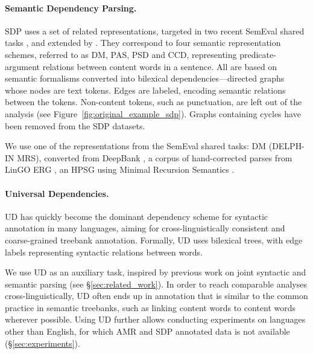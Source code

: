 \documentclass[11pt,a4paper]{article}
\begin{document}
\paragraph{Semantic Dependency Parsing.}\label{sec:sdp}

SDP uses a set of related representations, targeted in two recent SemEval shared tasks 
\cite{oepen2014semeval,oepen2015semeval}, and extended by \citet{oepen2016towards}.
They correspond to four semantic representation schemes, referred to as
DM, PAS, PSD and CCD, representing
predicate-argument relations between content words in a sentence.
All are based on semantic formalisms %
converted into bilexical dependencies---directed graphs whose nodes are text tokens.
Edges are labeled, encoding semantic relations between the tokens.
Non-content tokens, such as punctuation,
are left out of the analysis (see Figure~\ref{fig:original_example_sdp}).
Graphs containing cycles have been removed from the SDP datasets.

We use one of the representations
from the SemEval shared tasks: DM (DELPH-IN MRS), converted from 
DeepBank \cite{flickinger2012deepbank}, a corpus of hand-corrected parses from LinGO
ERG \cite{copestake2000open},
an HPSG \cite{pollard1994head}
using Minimal Recursion Semantics \cite{copestake2005minimal}.


\paragraph{Universal Dependencies.}\label{sec:ud}
UD \cite{nivre2016universal,11234/1-2515} has quickly become
the dominant dependency scheme for
syntactic  annotation in many languages,
aiming for cross-linguistically consistent and coarse-grained treebank
annotation. Formally, UD uses bilexical trees, with edge labels 
representing syntactic relations between words.

We use UD as an auxiliary task,
inspired by previous work on joint syntactic and semantic parsing
(see \S\ref{sec:related_work}).
In order to reach comparable analyses cross-linguistically,
UD often ends up in annotation that is similar to the common practice
in semantic treebanks, such as linking content words to content words wherever possible.
Using UD further allows conducting experiments on languages other than English, 
for which AMR and SDP annotated data is not available (\S\ref{sec:experiments}).
\end{document}
